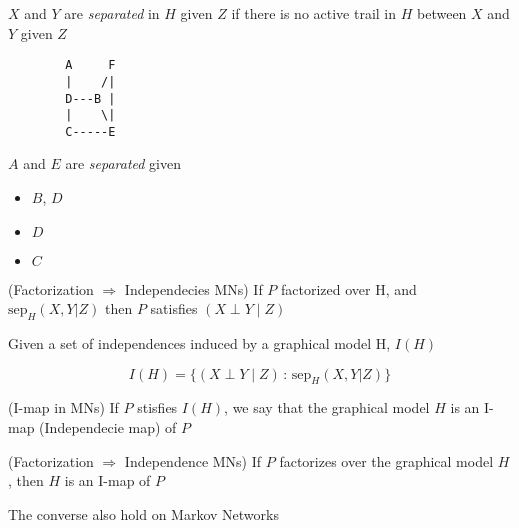 
\begin{midef}
 $X$ and $Y$ are \textit{separated} in $H$ given $Z$ if  there is no active trail in $H$ between $X$ and $Y$ given $Z$
\end{midef}

\vspace{0.3cm}
\begin{paracol}{3}
\centering
\begin{verbatim}
        A     F 
        |    /|
        D---B |
        |    \|  
        C-----E
\end{verbatim}

 \switchcolumn

 $A$ and $E$ are \textit{separated} given
\begin{itemize}
 \item $B$, $D$
 \item $D$
 \item $C$
\end{itemize}
 
\end{paracol}

\begin{miteo}(Factorization $\Rightarrow$ Independecies MNs)
 If $P$ factorized over H, and $\text{sep}_H(X,Y|Z)$ then $P$ satisfies $(X \perp Y \mid Z)$
\end{miteo}

Given a set of independences induced by a graphical model H, $I(H)$

\begin{equation}
 I(H) = \{(X \perp Y \mid Z) \, : \, \text{sep}_H(X,Y|Z) \}
\end{equation}

\begin{midef}(I-map in MNs) If $P$ stisfies $I(H)$, we say that the graphical model $H$ is an I-map (Independecie map) of $P$
\end{midef}

\begin{miteo}(Factorization $\Rightarrow$ Independence MNs)
 If $P$ factorizes over the graphical model $H$, then $H$ is an I-map of $P$
\end{miteo}

The converse also hold on Markov Networks






